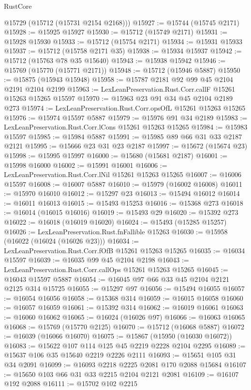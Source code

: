 \begin{lexlean}{RustCore}
\begin{coremodule}
      @15729
      (@15712 (@15731 @2154 @2168)))
@15927 := @15744 (@15745 @2171)
@15928 := @15925 @15927
@15930 := @15712 (@15749 @2171)
@15931 := @15928 @15930
@15933 := @15712 (@15754 @2171)
@15934 := @15931 @15933
@15937 := @15712 (@15758 @2171 @35)
@15938 := @15934 @15937
@15942 := @15712 (@15763 @78 @35 @15640)
@15943 := @15938 @15942
@15946 := @15769 (@15770 (@15771 @2171))
@15948 := @15712 (@15946 @5887)
@15950 := @15875 (@15943 @15948)
@15958 := @15787 @2181 @92 @99 @45 @2104 @2191 @2104 @2199
@15963 := LexLeanPreservation.Rust.Corr.callF @15261 @15263 @15265 @15597
@15970 := @15963 @23 @91 @34 @45 @2104 @2189 @273
@15974 := LexLeanPreservation.Rust.Corr.opsOfL @15261 @15263 @15265
@15976 := @15974 @15597 @5887
@15979 := @15976 @91 @34 @2189
@15983 := LexLeanPreservation.Rust.Corr.lCons @15261 @15263 @15265
@15984 := @15983 @15597
@15985 := @15984 @5887
@15991 := @15985 @89 @66 @31 @33 @2187 @2121
@15995 := @15666 @23 @31 @23 @2187
@15997 := @15672 (@15674 @23)
@15998 := @15995 @15997
@16000 := @15680 (@15681 @2187)
@16001 := @15998 @16000
@16002 := @15991 @16001
@16006 := LexLeanPreservation.Rust.Corr.lNil @15261 @15263 @15265
@16007 := @16006 @15597
@16008 := @16007 @5887
@16010 := @15979 (@16002 @16008)
@16011 := @15970 @16010
@16012 := @15297 @23
@16013 := @15494 @16012
@16014 := @16011 @16013
@16015 := @15493 @15253
@16016 := @15368 @273
@16018 := @16014 (@16015 @16016)
@16019 := @15493 @29
@16020 := @15392 @273
@16022 := @16018 (@16019 @16020)
@16024 := @15493 (@15285 @15257)
@16026 := LexLeanPreservation.Rust.fnFallible @15263
@16030 := @15958 (@16022 (@16024 (@16026 @23)))
@16034 := LexLeanPreservation.Rust.Corr.fOfB @15261 @15263 @15265
@16035 := @16034 @15597
@16039 := @16035 @99 @45 @2104 @2198
@16043 := LexLeanPreservation.Rust.Corr.callOps @15261 @15263 @15265
@16045 := @16043 @15597 @5887
@16054 := @16045 @97 @66 @33 @45 @2104 @2121 @2125 @314 @15725
@16055 := @15297 @97
@16056 := @15494 @16055
@16057 := @16054 @16056
@16058 := @15368 @314
@16059 := @16015 @16058
@16060 := @16057 @16059
@16061 := @15392 @314
@16062 := @16019 @16061
@16063 := @16060 @16062
@16065 := @16024 (@16026 @97)
@16066 := @16063 @16065
@16068 := @15769 (@15770 @2125)
@16070 := @15712 (@16068 @5887)
@16072 := @16039 (@16066 @16070)
@16075 := @15867 (@15950 (@16030 @16072))
@16083 := @15622 @107 @114 @125 @45 @2219 @2228 @2104 @2295
@16089 := @15637 @106 @35 @15640 @2219 @2226 @2111
@16093 := @15651 @105 @31 @34 @2091
@16099 := @16093 @2218 @2225 @2081 @170 @2088 @15684
@16107 := @15650 @103 @66 @31 @33 @2215 @2104 @2121 @2081
@16109 := @16107 @192 @2088
@16111 := @15702 @102 @2215

\end{coremodule}
\end{lexlean}
